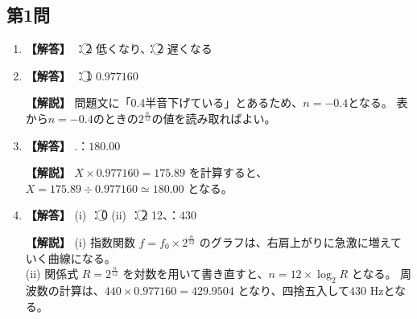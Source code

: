 \documentclass[uplatex,dvipdfmx,paper=a4paper,fontsize=11pt,jafontscale=0.9247,lang=ja]{jlreq}
\begin{document}
\subsection*{第1問}
\begin{enumerate}[label=(\arabic*)]
  \item \textbf{【解答】} ：\textcircled{\scriptsize 2} 低くなり、：\textcircled{\scriptsize 2} 遅くなる

  \item \textbf{【解答】} ：\textcircled{\scriptsize 1} $0.977160$
    
    \textbf{【解説】}
    問題文に「0.4半音下げている」とあるため、$n = -0.4$となる。
    表から$n = -0.4$のときの$2^{\frac{n}{12}}$の値を読み取ればよい。

  \item \textbf{【解答】} .：$180.00$
    
    \textbf{【解説】}
    $X \times 0.977160 = 175.89$ を計算すると、$X = 175.89 \div 0.977160 \simeq 180.00$ となる。

  \item \textbf{【解答】} (i) ：\textcircled{\scriptsize 0} \quad (ii) ：\textcircled{\scriptsize 2} 12、：$430$

    \textbf{【解説】}
    (i) 指数関数 $f = f_0 \times 2^{\frac{n}{12}}$ のグラフは、右肩上がりに急激に増えていく曲線になる。\\
    (ii) 関係式 $R = 2^{\frac{n}{12}}$ を対数を用いて書き直すと、$n = 12 \times \log_2 R$ となる。
    周波数の計算は、$440 \times 0.977160 = 429.9504$ となり、四捨五入して$430$ Hzとなる。
\end{enumerate}
\end{document}
